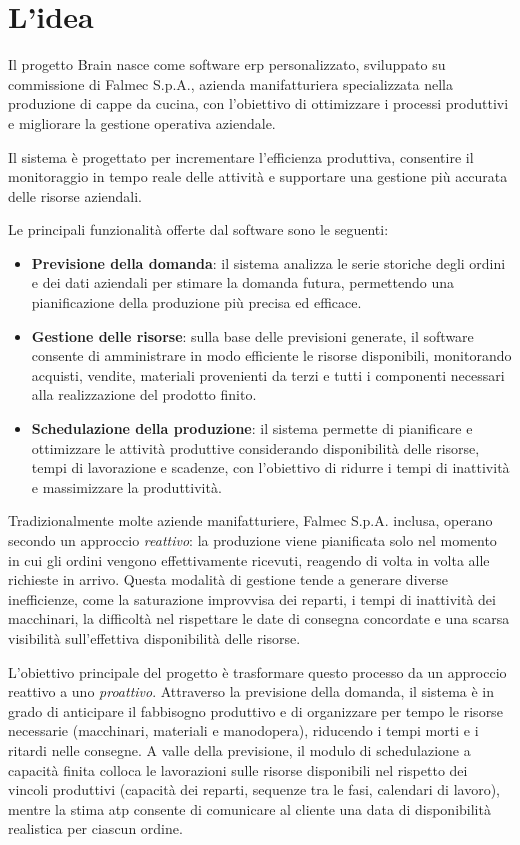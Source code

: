 \section{L'idea}
Il progetto Brain nasce come software \gls{erp} personalizzato, sviluppato su commissione di Falmec S.p.A., azienda manifatturiera specializzata nella produzione di cappe da cucina, con l'obiettivo di ottimizzare i processi produttivi e migliorare la gestione operativa aziendale.

Il sistema è progettato per incrementare l'efficienza produttiva, consentire il monitoraggio in tempo reale delle attività e supportare una gestione più accurata delle risorse aziendali.

Le principali funzionalità offerte dal software sono le seguenti:

\begin{itemize}
\item \textbf{Previsione della domanda}: il sistema analizza le serie storiche degli ordini e dei dati aziendali per stimare la domanda futura, permettendo una 
pianificazione della produzione più precisa ed efficace.
\item \textbf{Gestione delle risorse}: sulla base delle previsioni generate, il software consente di amministrare in modo efficiente le risorse disponibili, monitorando acquisti, vendite, 
materiali provenienti da terzi e tutti i componenti necessari alla realizzazione del prodotto finito.
\item \textbf{Schedulazione della produzione}: il sistema permette di pianificare e ottimizzare le attività produttive considerando disponibilità delle risorse, 
tempi di lavorazione e scadenze, con l'obiettivo di ridurre i tempi di inattività e massimizzare la produttività.
\end{itemize}

Tradizionalmente molte aziende manifatturiere, Falmec S.p.A. inclusa, operano secondo un approccio \textit{reattivo}: la produzione viene pianificata solo nel momento in cui gli ordini vengono effettivamente ricevuti, reagendo di volta in volta alle richieste in arrivo. Questa modalità di gestione tende a generare diverse inefficienze, come la saturazione improvvisa dei reparti, i tempi di inattività dei macchinari, la difficoltà nel rispettare le date di consegna concordate e una scarsa visibilità sull'effettiva disponibilità delle risorse.

L'obiettivo principale del progetto è trasformare questo processo da un approccio reattivo a uno \textit{proattivo}. Attraverso la previsione della domanda, il sistema è in grado di anticipare il fabbisogno produttivo e di organizzare per tempo le risorse necessarie (macchinari, materiali e manodopera), riducendo i tempi morti e i ritardi nelle consegne. A valle della previsione, il modulo di schedulazione a capacità finita colloca le lavorazioni sulle risorse disponibili nel rispetto dei vincoli produttivi (capacità dei reparti, sequenze tra le fasi, calendari di lavoro), mentre la stima \gls{atp} consente di comunicare al cliente una data di disponibilità realistica per ciascun ordine.

